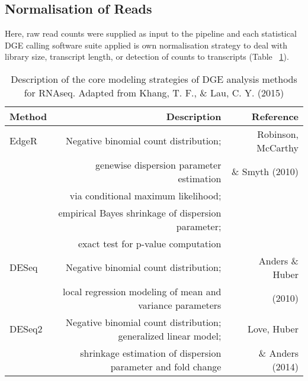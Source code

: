\subsection{Normalisation of Reads}
Here, raw read counts were supplied as input to the pipeline and each statistical DGE calling software suite applied is own normalisation strategy to deal with library size, transcript length, or detection of counts to transcripts (Table ~\ref{tab:RNAseqnorm}). \\

\begin{table}[!hbtp]
\scriptsize
\centering
\begin{tabular}{lrr}
\textbf{Method}                          & \textbf{Description}                                                    &        \textbf{Reference} \\
\hline    
EdgeR                           & Negative binomial count distribution;                                           & Robinson, McCarthy  \\
                                & genewise dispersion parameter estimation                                        & \& Smyth (2010) \cite{Robinson2010}                \\
                                & via conditional maximum likelihood;                                             & \\
                                & empirical Bayes shrinkage of dispersion parameter;                              &             \\
                                & exact test for p-value computation                                              &       \\
DESeq                           & Negative binomial count distribution;                                           & Anders \& Huber  \\
                                & local regression modeling of mean and variance parameters                       & (2010) \cite{Anders2010}\\
DESeq2                          & Negative binomial count distribution; generalized linear model;                 & Love, Huber \\
                                & shrinkage estimation of dispersion parameter and fold change                    & \& Anders (2014) \cite{Love2014}\\
\end{tabular}
\caption{Description of the core modeling strategies of DGE analysis methods for RNAseq. Adapted from Khang, T. F., \& Lau, C. Y. (2015) \cite{Khang2015a}}
\label{tab:RNAseqnorm}	
\end{table}

